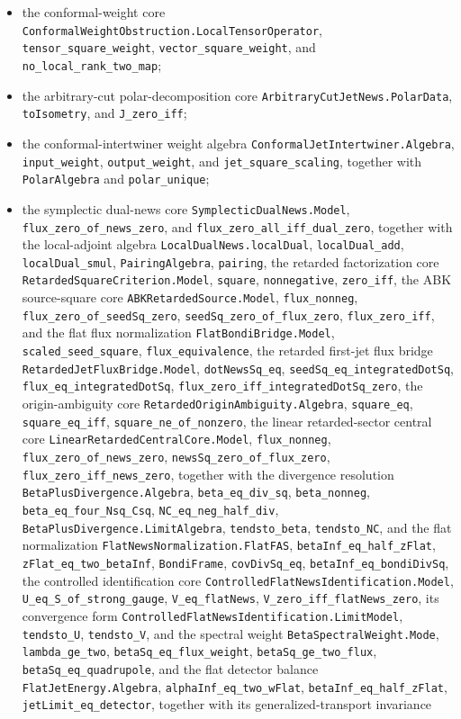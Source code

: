\documentclass[11pt,a4paper]{article}
\begin{document}
\begin{itemize}
  \item the conformal-weight core \texttt{ConformalWeightObstruction.LocalTensorOperator}, \texttt{tensor\_square\_weight}, \texttt{vector\_square\_weight}, and \texttt{no\_local\_rank\_two\_map};
  \item the arbitrary-cut polar-decomposition core \texttt{ArbitraryCutJetNews.PolarData}, \texttt{toIsometry}, and \texttt{J\_zero\_iff};
  \item the conformal-intertwiner weight algebra \texttt{ConformalJetIntertwiner.Algebra}, \texttt{input\_weight}, \texttt{output\_weight}, and \texttt{jet\_square\_scaling}, together with \texttt{PolarAlgebra} and \texttt{polar\_unique};
  \item the symplectic dual-news core \texttt{SymplecticDualNews.Model}, \texttt{flux\_zero\_of\_news\_zero}, and \texttt{flux\_zero\_all\_iff\_dual\_zero}, together with the local-adjoint algebra \texttt{LocalDualNews.localDual}, \texttt{localDual\_add}, \texttt{localDual\_smul}, \texttt{PairingAlgebra}, \texttt{pairing}, the retarded factorization core \texttt{RetardedSquareCriterion.Model}, \texttt{square}, \texttt{nonnegative}, \texttt{zero\_iff}, the ABK source-square core \texttt{ABKRetardedSource.Model}, \texttt{flux\_nonneg}, \texttt{flux\_zero\_of\_seedSq\_zero}, \texttt{seedSq\_zero\_of\_flux\_zero}, \texttt{flux\_zero\_iff}, and the flat flux normalization \texttt{FlatBondiBridge.Model}, \texttt{scaled\_seed\_square}, \texttt{flux\_equivalence}, the retarded first-jet flux bridge \texttt{RetardedJetFluxBridge.Model}, \texttt{dotNewsSq\_eq}, \texttt{seedSq\_eq\_integratedDotSq}, \texttt{flux\_eq\_integratedDotSq}, \texttt{flux\_zero\_iff\_integratedDotSq\_zero}, the origin-ambiguity core \texttt{RetardedOriginAmbiguity.Algebra}, \texttt{square\_eq}, \texttt{square\_eq\_iff}, \texttt{square\_ne\_of\_nonzero}, the linear retarded-sector central core \texttt{LinearRetardedCentralCore.Model}, \texttt{flux\_nonneg}, \texttt{flux\_zero\_of\_news\_zero}, \texttt{newsSq\_zero\_of\_flux\_zero}, \texttt{flux\_zero\_iff\_news\_zero}, together with the divergence resolution \texttt{BetaPlusDivergence.Algebra}, \texttt{beta\_eq\_div\_sq}, \texttt{beta\_nonneg}, \texttt{beta\_eq\_four\_Nsq\_Csq}, \texttt{NC\_eq\_neg\_half\_div}, \texttt{BetaPlusDivergence.LimitAlgebra}, \texttt{tendsto\_beta}, \texttt{tendsto\_NC}, and the flat normalization \texttt{FlatNewsNormalization.FlatFAS}, \texttt{betaInf\_eq\_half\_zFlat}, \texttt{zFlat\_eq\_two\_betaInf}, \texttt{BondiFrame}, \texttt{covDivSq\_eq}, \texttt{betaInf\_eq\_bondiDivSq}, the controlled identification core \texttt{ControlledFlatNewsIdentification.Model}, \texttt{U\_eq\_S\_of\_strong\_gauge}, \texttt{V\_eq\_flatNews}, \texttt{V\_zero\_iff\_flatNews\_zero}, its convergence form \texttt{ControlledFlatNewsIdentification.LimitModel}, \texttt{tendsto\_U}, \texttt{tendsto\_V}, and the spectral weight \texttt{BetaSpectralWeight.Mode}, \texttt{lambda\_ge\_two}, \texttt{betaSq\_eq\_flux\_weight}, \texttt{betaSq\_ge\_two\_flux}, \texttt{betaSq\_eq\_quadrupole}, and the flat detector balance \texttt{FlatJetEnergy.Algebra}, \texttt{alphaInf\_eq\_two\_wFlat}, \texttt{betaInf\_eq\_half\_zFlat}, \texttt{jetLimit\_eq\_detector}, together with its generalized-transport invariance 
\end{itemize}
\end{document}
